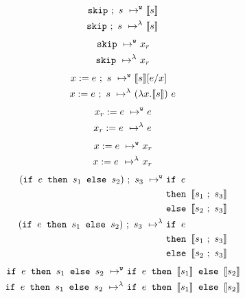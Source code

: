 \documentclass[11pt, leqno, titlepage]{article}
\theoremstyle{definition}
\begin{document}
\begin{align}
  \texttt{skip} ~;~s ~\mapsto^{\texttt{w}}~ & \llbracket s \rrbracket\\
  \texttt{skip} ~;~s ~\mapsto^\lambda~ & \llbracket s \rrbracket\notag
\end{align}
\begin{align}
  \texttt{skip}     ~\mapsto^{\texttt{w}}~ & x_r\\
  \texttt{skip}     ~\mapsto^\lambda~ & x_r\notag
\end{align}
\begin{align}
  x := e~;~s        ~\mapsto^{\texttt{w}}~ & \llbracket s\rrbracket[e / x]\notag\\
  x := e~;~s        ~\mapsto^\lambda~ & (\lambda x.\llbracket s \rrbracket)~e
\end{align}
\begin{align}
  x_r := e          ~\mapsto^{\texttt{w}}~ & e \\
  x_r := e          ~\mapsto^\lambda~ & e \notag
\end{align}
\begin{align}
  x := e            ~\mapsto^{\texttt{w}}~ & x_r \\
  x := e            ~\mapsto^\lambda~ & x_r \notag
\end{align}
\begin{align}
  (\texttt{if } e \texttt{ then } s_1 \texttt{ else } s_2) ~;~s_3
                    ~\mapsto^{\texttt{w}}~ & \texttt{if } e \\
                    &  \texttt{then } \llbracket s_1 ~;~ s_3 \rrbracket\notag\\
                    & \texttt{else } \llbracket s_2 ~;~ s_3 \rrbracket \notag\\
  (\texttt{if } e \texttt{ then } s_1 \texttt{ else } s_2) ~;~s_3
                    ~\mapsto^\lambda~ &  \texttt{if } e \\
                    &  \texttt{then } \llbracket s_1 ~;~ s_3 \rrbracket\notag\\
                    & \texttt{else } \llbracket s_2 ~;~ s_3 \rrbracket \notag
\end{align}
\begin{align}
  \texttt{if } e \texttt{ then } s_1 \texttt{ else } s_2
                    ~\mapsto^{\texttt{w}}~ & \texttt{if } e
                                  \texttt{ then } \llbracket s_1 \rrbracket
                                  \texttt{ else } \llbracket s_2 \rrbracket \\
  \texttt{if } e \texttt{ then } s_1 \texttt{ else } s_2
                    ~\mapsto^\lambda~ & \texttt{if } e
                                  \texttt{ then } \llbracket s_1 \rrbracket
                                  \texttt{ else } \llbracket s_2 \rrbracket \notag
\end{align}
\end{document}
